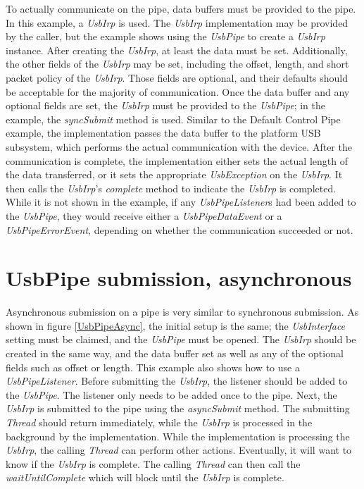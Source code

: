 \documentclass{article}
\newcommand{\myclass}[1]{\emph{#1}}
\newcommand{\myinterface}[1]{\emph{#1}}
\newcommand{\mymethod}[1]{\emph{#1}}
\begin{document}
To actually communicate on the pipe, data buffers must be provided to the pipe.
In this example, a \myinterface{UsbIrp} is used.  The \myinterface{UsbIrp} implementation may be provided
by the caller, but the example shows using the \myinterface{UsbPipe} to create a \myinterface{UsbIrp}
instance.  After creating the \myinterface{UsbIrp}, at least the data must be set.  Additionally,
the other fields of the \myinterface{UsbIrp} may be set, including the offset, length, and short
packet policy of the \myinterface{UsbIrp}.  Those fields are optional, and their defaults should
be acceptable for the majority of communication.  Once the data buffer and any
optional fields are set, the \myinterface{UsbIrp} must be provided to the \myinterface{UsbPipe}; in the example,
the \mymethod{syncSubmit} method is used.  Similar to the Default Control Pipe
example, the implementation passes the data buffer to the platform USB subsystem,
which performs the actual communication with the device.  After the communication
is complete, the implementation either sets the actual length of the data
transferred, or it sets the appropriate \myclass{UsbException} on the \myinterface{UsbIrp}.  It then
calls the \myinterface{UsbIrp}'s \mymethod{complete} method to indicate the \myinterface{UsbIrp} is completed.
While it is not shown in the example, if any \myinterface{UsbPipeListener}s had been added to
the \myinterface{UsbPipe}, they would receive either a \myclass{UsbPipeDataEvent} or a \myclass{UsbPipeErrorEvent},
depending on whether the communication succeeded or not.

\begin{figure}
\label{UsbPipeSync}
\end{figure}


\section{UsbPipe submission, asynchronous}

Asynchronous submission on a pipe is very similar to synchronous submission.
As shown in figure \ref{UsbPipeAsync}, the initial setup is the same; the
\myinterface{UsbInterface} setting must be claimed, and the \myinterface{UsbPipe} must be opened.  The
\myinterface{UsbIrp} should be created in the same way, and the data buffer set as well
as any of the optional fields such as offset or length.  This example also
shows how to use a \myinterface{UsbPipeListener}.  Before submitting the \myinterface{UsbIrp}, the
listener should be added to the \myinterface{UsbPipe}.  The listener only needs to be added
once to the pipe.  Next, the \myinterface{UsbIrp} is submitted to the pipe using the
\mymethod{asyncSubmit} method.  The submitting \myclass{Thread} should return
immediately, while the \myinterface{UsbIrp} is processed in the background by the implementation.
While the implementation is processing the \myinterface{UsbIrp}, the calling \myclass{Thread} can perform
other actions.  Eventually, it will want to know if the \myinterface{UsbIrp} is complete.  The
calling \myclass{Thread} can then call the \mymethod{waitUntilComplete} which will block
until the \myinterface{UsbIrp} is complete.  
\end{document}
